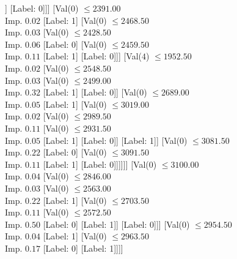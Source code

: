 \documentclass[margin=10pt]{standalone}
\begin{document}
\begin{forest}
															[Label: 0]
															[Label: 1]]
														[Label: 0]]]
												[Val($0$) $ \leq 2391.00$ \\ Imp. $0.02$
													[Label: 1]
													[Val($0$) $ \leq 2468.50$ \\ Imp. $0.03$
														[Val($0$) $ \leq 2428.50$ \\ Imp. $0.06$
															[Label: 0]
															[Val($0$) $ \leq 2459.50$ \\ Imp. $0.11$
																[Label: 1]
																[Label: 0]]]
														[Val($4$) $ \leq 1952.50$ \\ Imp. $0.02$
															[Val($0$) $ \leq 2548.50$ \\ Imp. $0.03$
																[Val($0$) $ \leq 2499.00$ \\ Imp. $0.32$
																	[Label: 1]
																	[Label: 0]]
																[Val($0$) $ \leq 2689.00$ \\ Imp. $0.05$
																	[Label: 1]
																	[Val($0$) $ \leq 3019.00$ \\ Imp. $0.02$
																		[Val($0$) $ \leq 2989.50$ \\ Imp. $0.11$
																			[Val($0$) $ \leq 2931.50$ \\ Imp. $0.05$
																				[Label: 1]
																				[Label: 0]]
																			[Label: 1]]
																		[Val($0$) $ \leq 3081.50$ \\ Imp. $0.22$
																			[Label: 0]
																			[Val($0$) $ \leq 3091.50$ \\ Imp. $0.11$
																				[Label: 1]
																				[Label: 0]]]]]]
															[Val($0$) $ \leq 3100.00$ \\ Imp. $0.04$
																[Val($0$) $ \leq 2846.00$ \\ Imp. $0.03$
																	[Val($0$) $ \leq 2563.00$ \\ Imp. $0.22$
																		[Label: 1]
																		[Val($0$) $ \leq 2703.50$ \\ Imp. $0.11$
																			[Val($0$) $ \leq 2572.50$ \\ Imp. $0.50$
																				[Label: 0]
																				[Label: 1]]
																			[Label: 0]]]
																	[Val($0$) $ \leq 2954.50$ \\ Imp. $0.04$
																		[Label: 1]
																		[Val($0$) $ \leq 2963.50$ \\ Imp. $0.17$
																			[Label: 0]
																			[Label: 1]]]]

\end{forest}
\end{document}
